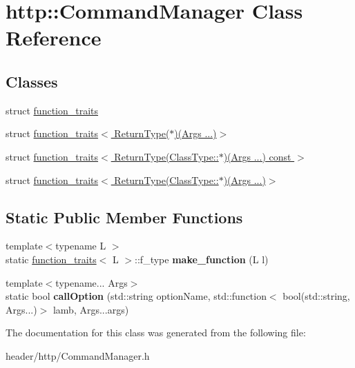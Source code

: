 \hypertarget{classhttp_1_1_command_manager}{}\section{http\+:\+:Command\+Manager Class Reference}
\label{classhttp_1_1_command_manager}
\subsection*{Classes}
\begin{DoxyCompactItemize}
\item 
struct \hyperlink{structhttp_1_1_command_manager_1_1function__traits}{function\+\_\+traits}
\item 
struct \hyperlink{structhttp_1_1_command_manager_1_1function__traits_3_01_return_type_07_5_08_07_args_01_8_8_8_08_4}{function\+\_\+traits$<$ Return\+Type($\ast$)(\+Args ...)$>$}
\item 
struct \hyperlink{structhttp_1_1_command_manager_1_1function__traits_3_01_return_type_07_class_type_1_1_5_08_07_args_01_8_8_8_08_01const_01_4}{function\+\_\+traits$<$ Return\+Type(\+Class\+Type\+::$\ast$)(\+Args ...) const $>$}
\item 
struct \hyperlink{structhttp_1_1_command_manager_1_1function__traits_3_01_return_type_07_class_type_1_1_5_08_07_args_01_8_8_8_08_4}{function\+\_\+traits$<$ Return\+Type(\+Class\+Type\+::$\ast$)(\+Args ...)$>$}
\end{DoxyCompactItemize}
\subsection*{Static Public Member Functions}
\begin{DoxyCompactItemize}
\item 
\mbox{\label{classhttp_1_1_command_manager_ad575593c8b3ca2c273a204cccb7393ca}} 
{\footnotesize template$<$typename L $>$ }\\static \hyperlink{structhttp_1_1_command_manager_1_1function__traits}{function\+\_\+traits}$<$ L $>$\+::f\+\_\+type {\bfseries make\+\_\+function} (L l)
\item 
\mbox{\label{classhttp_1_1_command_manager_ac47e1149d68e7fdf1363153c6348831a}} 
{\footnotesize template$<$typename... Args$>$ }\\static bool {\bfseries call\+Option} (std\+::string option\+Name, std\+::function$<$ bool(std\+::string, Args...)$>$ lamb, Args...\+args)
\end{DoxyCompactItemize}


The documentation for this class was generated from the following file\+:\begin{DoxyCompactItemize}
\item 
header/http/Command\+Manager.\+h\end{DoxyCompactItemize}
